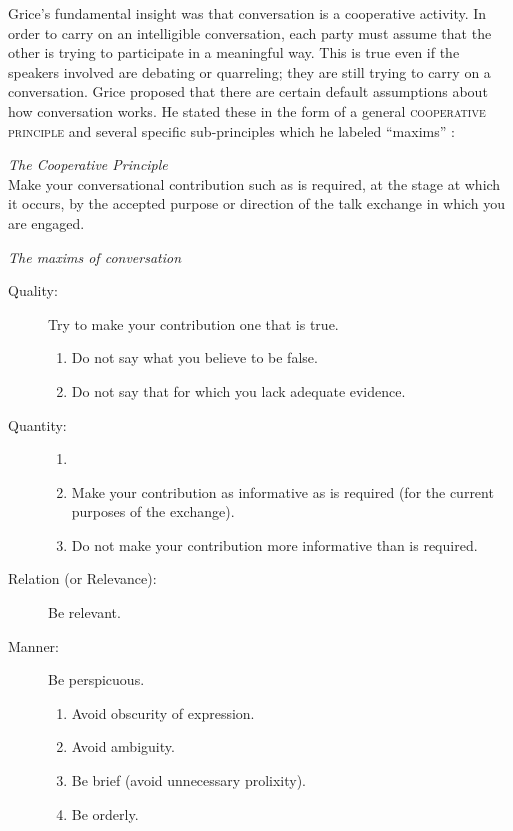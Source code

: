 Grice’s fundamental insight was that conversation is a cooperative activity. In order to carry on an intelligible conversation, each party must assume that the other is trying to participate in a meaningful way. This is true even if the speakers involved are debating or quarreling; they are still trying to carry on a conversation. Grice proposed that there are certain default assumptions about how conversation works. He stated these in the form of a general \textsc{cooperative principle}  and several specific sub-principles which he labeled “maxims” :


\ea \label{ex:8.5}
\textit{The Cooperative Principle} \citep[45]{Grice1975}\\
Make your conversational contribution such as is required, at the stage at which it occurs, by the accepted purpose or direction of the talk exchange in which you are engaged.
\z

\ea \label{ex:8.6}
\textit{The maxims of conversation} \citep[45--46]{Grice1975}

\begin{description}
\item[Quality:] Try to make your contribution one that is true.
    \begin{enumerate}
    \item  Do not say what you believe to be false.
    \item  Do not say that for which you lack adequate evidence.
    \end{enumerate}

\item[Quantity:]
    \begin{enumerate}
    \item[]
    \item Make your contribution as informative as is required (for the current purposes of the exchange).
    \item Do not make your contribution more informative than is required.
    \end{enumerate}

\item[Relation \textup{(or} Relevance\textup{)}:] Be relevant.
 
\item[Manner:] Be perspicuous.
    \begin{enumerate}
    \item Avoid obscurity of expression.
    \item Avoid ambiguity.
    \item Be brief (avoid unnecessary prolixity).
    \item Be orderly.
    \end{enumerate}
\end{description}
\z


